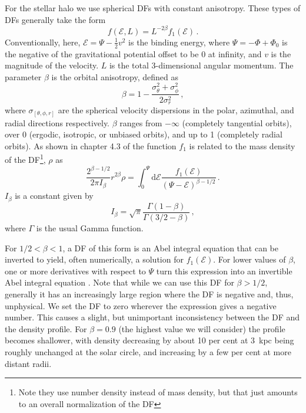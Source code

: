 For the stellar halo we use spherical DFs with constant anisotropy. These types of DFs generally take the form
\begin{equation}
    f(\mathcal{E},L) = L^{-2\beta} f_{1}(\mathcal{E})\,.
\end{equation}
Conventionally, here, $\mathcal{E} = \Psi-\frac{1}{2}v^{2}$ is the binding energy, where $\Psi = -\Phi+\Phi_{0}$ is the negative of the gravitational potential offset to be 0 at infinity, and $v$ is the magnitude of the velocity. $L$ is the total 3-dimensional angular momentum. The parameter $\beta$ is the orbital anisotropy, defined as
\begin{equation}
    \beta = 1- \frac{\sigma^{2}_{\theta} + \sigma^{2}_{\phi}}{2\sigma^{2}_{r}}\,,
\end{equation}
where $\sigma_{[\theta,\phi,r]}$ are the spherical velocity dispersions in the polar, azimuthal, and radial directions respectively. $\beta$ ranges from $-\infty$ (completely tangential orbits), over 0 (ergodic, isotropic, or unbiased orbits), and up to 1 (completely radial orbits). As shown in chapter 4.3 of \textcite{binney08} the function $f_{1}$ is related to the mass density of the DF\footnote{Note they use number density instead of mass density, but that just amounts to an overall normalization of the DF}, $\rho$ as
\begin{equation}
    \label{eq:AbelIntegral}
    \frac{ 2^{\beta-1/2} }{ 2\pi I_{\beta} } r^{2\beta}\rho = \int_{0}^{\Psi} \mathrm{d}\mathcal{E} \frac{ f_{1}(\mathcal{E}) }{ (\Psi-\mathcal{E})^{\beta-1/2} }\,.
\end{equation}
$I_{\beta}$ is a constant given by
\begin{equation}
    I_{\beta} = \sqrt{\pi}\frac{\Gamma(1-\beta)}{\Gamma(3/2-\beta)}\,,
\end{equation}
where $\Gamma$ is the usual Gamma function.

For $1/2 < \beta < 1$, a DF of this form is an Abel integral equation that can be inverted to yield, often numerically, a solution for $f_{1}(\mathcal{E})$. For lower values of $\beta$, one or more derivatives with respect to $\Psi$ turn this expression into an invertible Abel integral equation \parencite{cuddeford91}. Note that while we can use this DF for $\beta > 1/2$, generally it has an increasingly large region where the DF is negative and, thus, unphysical. We set the DF to zero wherever the expression gives a negative number. This causes a slight, but unimportant inconsistency between the DF and the density profile. For $\beta=0.9$ (the highest value we will consider) the profile becomes shallower, with density decreasing by about 10 per cent at 3~kpc being roughly unchanged at the solar circle, and increasing by a few per cent at more distant radii.

